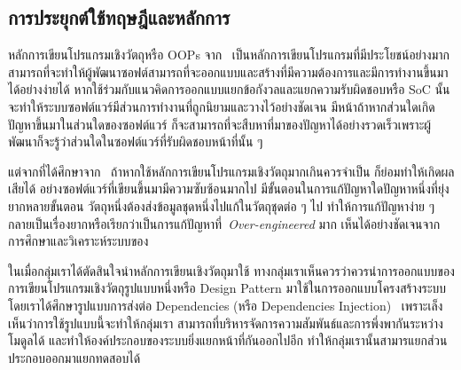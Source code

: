 \documentclass[12pt,one side,openright,a4paper]{cpe-thesis-th}
\newcommand{\thaijustify}[1]{%
  \par\hspace{30pt}\justifying
  #1
}
\begin{document}
\subsection{การประยุกต์ใช้ทฤษฎีและหลักการ}
\thaijustify{
  หลักการเขียนโปรแกรมเชิงวัตถุหรือ OOPs จาก~\cite{booch87, meyer2000, apollo22oop} เป็นหลักการเขียนโปรแกรมที่มีประโยชน์อย่างมาก สามารถที่จะทำให้ผู้พัฒนาซอฟต์สามารถที่จะออกแบบและสร้างที่มีความต้องการและมีการทำงานขึ้นมาได้อย่างง่ายได้ หากใช้ร่วมกับแนวคิดการออกแบบแยกข้อกังวลและแยกความรับผิดชอบหรือ SoC นั้น จะทำให้ระบบซอฟต์แวร์มีส่วนการทำงานที่ถูกนิยามและวางไว้อย่างชัดเจน มีหน้าถ้าหากส่วนใดเกิดปัญหาขึ้นมาในส่วนใดของซอฟต์แวร์ ก็จะสามารถที่จะสืบหาที่มาของปัญหาได้อย่างรวดเร็วเพราะผู้พัฒนาก็จะรู้ว่าส่วนใดในซอฟต์แวร์ที่รับผิดชอบหน้าที่นั้น ๆ~\cite{nattawat20pgs, wikipedia04soc}
}
\thaijustify{
  แต่จากที่ได้ศึกษาจาก~\cite{thomas99pragmatic, fowler13oop, nattawat20pgs} ถ้าหากใช้หลักการเขียนโปรแกรมเชิงวัตถุมากเกินควรจำเป็น ก็ย่อมทำให้เกิดผลเสียได้ อย่างซอฟต์แวร์ที่เขียนขึ้นมามีความซับซ้อนมากไป มีขั้นตอนในการแก้ปัญหาใดปัญหาหนึ่งที่ยุ่งยากหลายขั้นตอน วัตถุหนึ่งต้องส่งข้อมูลชุดหนึ่งไปแก้ในวัตถุชุดต่อ ๆ ไป ทำให้การแก้ปัญหาง่าย ๆ กลายเป็นเรื่องยากหรือเรียกว่าเป็นการแก้ปัญหาที่~\textit{Over-engineered} มาก เห็นได้อย่างชัดเจนจากการศึกษาและวิเคราะห์ระบบของ~\cite{nattawat20pgs}
}
\thaijustify{
  ในเมื่อกลุ่มเราได้ตัดสินใจนำหลักการเขียนเชิงวัตถุมาใช้ ทางกลุ่มเราเห็นควรว่าควรนำการออกแบบของการเขียนโปรแกรมเชิงวัตถุรูปแบบหนึ่งหรือ Design Pattern มาใช้ในการออกแบบโครงสร้างระบบ โดยเราได้ศึกษารูปแบบการส่งต่อ Dependencies (หรือ Dependencies Injection)~\cite{shore06, fowlerDI, freeman09} เพราะเล็งเห็นว่าการใช้รูปแบบนี้จะทำให้กลุ่มเรา สามารถที่บริหารจัดการความสัมพันธ์และการพึ่งพากันระหว่างโมดูลได้ และทำให้องค์ประกอบของระบบยิ่งแยกหน้าที่กันออกไปอีก ทําให้กลุ่มเรานั้นสามารแยกส่วนประกอบออกมาแยกทดสอบได้~\cite{fowlerDI, tiwaristackdi, toanstackdi}
}
\end{document}
